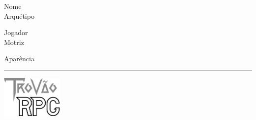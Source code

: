 \documentclass[a4paper,12pt]{article}
\begin{document}
	\begin{minipage}[t][][t]{\linewidth}
		\begin{minipage}[t][][t]{\dimexpr(\linewidth-3.2cm)\relax}
			\begin{minipage}[t][][t]{.5\linewidth}
				Nome \hrulefill \\
				Arqu\'{e}tipo \hrulefill
			\end{minipage}%
			\hspace{.01\linewidth}%
			\begin{minipage}[t][][t]{.49\linewidth}
				Jogador \hrulefill \\
				Motriz \hrulefill
			\end{minipage}
			Apar\^{e}ncia \hrulefill \\
			\rule{\linewidth}{.5pt}
		\end{minipage}%
		\hspace{.2cm}%
		\begin{minipage}[t][][t]{3cm}
			\includegraphics[width=3cm, valign=t]{img/logo.png}
		\end{minipage}
	\end{minipage}\\
	
\end{document}
